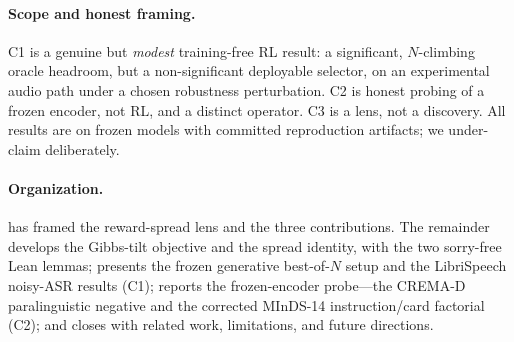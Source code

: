 \paragraph{Scope and honest framing.}
C1 is a genuine but \emph{modest} training-free RL result: a significant, $N$-climbing oracle headroom, but a non-significant deployable selector, on an experimental audio path under a chosen robustness perturbation. C2 is honest probing of a frozen encoder, not RL, and a distinct operator. C3 is a lens, not a discovery. All results are on frozen models with committed reproduction artifacts; we under-claim deliberately.

\paragraph{Organization.}
 has framed the reward-spread lens and the three contributions. The remainder develops the Gibbs-tilt objective and the spread identity, with the two sorry-free Lean lemmas; presents the frozen generative best-of-$N$ setup and the LibriSpeech noisy-ASR results (C1); reports the frozen-encoder probe---the CREMA-D paralinguistic negative and the corrected MInDS-14 instruction/card factorial (C2); and closes with related work, limitations, and future directions.